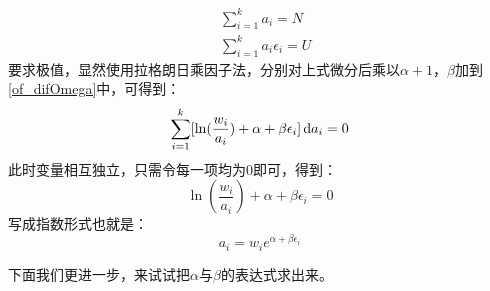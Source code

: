 \begin{prove}
    \begin{equation}
        \begin{aligned}
             & \sum_{i=1}^{k}a_i = N            \\
             & \sum_{i=1}^{k}a_i \epsilon_i = U
            \label{of_U}
        \end{aligned}
    \end{equation}
    要求极值，显然使用拉格朗日乘因子法，分别对上式微分后乘以$\alpha + 1$，$\beta$加到\ref{of_difOmega}中，可得到：
    \begin{equation}
        \sum_{i=1}^{k} [\ln(\frac{w_i}{a_i})+\alpha+\beta \epsilon_i] \dif{a_i} = 0
    \end{equation}
    此时变量相互独立，只需令每一项均为0即可，得到：
    \begin{equation}
        \ln(\frac{w_i}{a_i})+\alpha+\beta \epsilon_i = 0
        \label{of_a_i}
    \end{equation}
    写成指数形式也就是：
    \begin{equation}
        a_i = w_i e^{\alpha + \beta \epsilon_i}
        \label{of_a_i_2}
    \end{equation}

    下面我们更进一步，来试试把$\alpha$与$\beta$的表达式求出来。


\end{prove}
